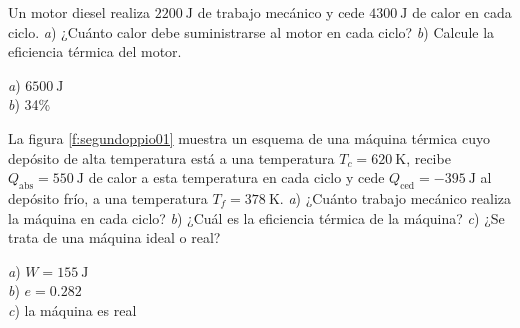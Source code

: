 \setcounter{figure}{0}
%
\begin{Exercise}
  Un motor diesel realiza $\SI{2200}{\joule}$ de trabajo mecánico y cede $\SI{4300}{\joule}$ de calor en cada ciclo. \textit{a}) ¿Cuánto calor debe suministrarse al motor en cada ciclo? \textit{b}) Calcule la eficiencia térmica del motor.
\end{Exercise}
\begin{Answer}
	\begin{minipage}[t]{.4\textwidth}
    \textit{a}) $\SI{6500}{\joule}$\\ \textit{b}) 34\%
  \end{minipage}
\end{Answer}
%
\begin{Exercise}\label{p:segundoppio01}
  La figura \ref{f:segundoppio01} muestra un esquema de una máquina térmica cuyo depósito de alta temperatura está a una temperatura $T_c = \SI{620}{\kelvin}$, recibe $Q_\text{abs} = \SI{550}{\joule}$ de calor a esta temperatura en cada ciclo y cede $Q_\text{ced} = \SI{-395}{\joule}$ al depósito frío, a una temperatura $T_f = \SI{378}{\kelvin}$. \textit{a}) ¿Cuánto trabajo mecánico realiza la máquina en cada ciclo? \textit{b}) ¿Cuál es la eficiencia térmica de la máquina? \textit{c}) ¿Se trata de una máquina ideal o real?
\end{Exercise}
\begin{Answer}
	\begin{minipage}[t]{.4\textwidth}
    \textit{a}) $W = \SI{155}{\joule}$\\ \textit{b}) $e = 0.282$\\ \textit{c}) la máquina es real
  \end{minipage}
\end{Answer}
%
\begin{center}
\end{center}

